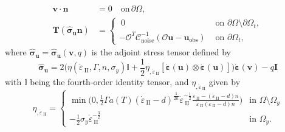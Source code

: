 \documentclass[12pt]{article}
\newcommand{\IIinv}{{\dot\varepsilon}_{\mathrm{\!\!\:II}}}
\newcommand{\uu}{{\ensuremath{\boldsymbol{u}}}}
\newcommand{\vv}{{\ensuremath{\boldsymbol{v}}}}
\newcommand{\ssigma}{{\ensuremath{\boldsymbol{\sigma}}}}
\newcommand{\strain}{{\ensuremath{\dot{\boldsymbol{\varepsilon}}}}}
\begin{document}
\begin{align*}
  \vv\cdot \textbf{n}&=0 \quad \text{on} \, \partial \Omega, \\
  \textbf{T}(\hat\ssigma_\uu \textbf{n})
  &=\begin{cases} \:0 & \text{ on }\partial \Omega\setminus
  \partial\Omega_t, \\
  -\mathcal{O}^T\mathcal{C}^{-1}_{\text{noise}}(\mathcal O \uu-\uu_{\text{obs}}) &\text{ on }
  \partial\Omega_t,
  \end{cases}
  \label{eq:adjoint}
\end{align*}
where $\hat\ssigma_\uu = \hat\ssigma_\uu(\vv,q)$ is the adjoint stress
tensor defined by
\begin{equation}\label{eq:sigma_hat}
\hat\ssigma_\uu  = 2 \Big(\eta(\IIinv,\Gamma, n,
\sigma_y)\mathbb{I}+\frac{1}{2} \eta_{,\IIinv} [\strain(\uu)\otimes
      \strain(\uu)]\Big)\strain(\vv) -q\textbf{I}
\end{equation}
with $\mathbb{I}$ being the fourth-order identity tensor, and
$\eta_{,\IIinv}$ given by
\begin{equation}
  \eta_{,\IIinv} \!\!=\!\!
  \begin{cases}
   \min\!\Big(0, \frac{1}{2}\Gamma
   a(T)(\IIinv-d)^{\frac{1}{2n}}\IIinv^{-\frac{1}{2}}\frac{\IIinv-(\IIinv-d)n}{\IIinv(\IIinv-d)n}\Big)
   &\text{in } \Omega\setminus\Omega_y 
   \\
   -\frac{1}{2}\sigma_{y}\IIinv^{-\frac{3}{2}}  &\text{in } \Omega_y.
  \end{cases}
\end{equation}
\end{document}
